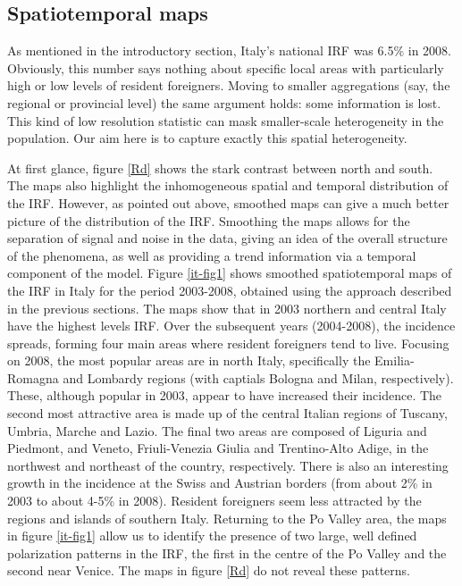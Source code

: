 \subsection{Spatiotemporal maps \label{STT}}

As mentioned in the introductory section, Italy's national IRF was 6.5\% in 2008. Obviously, this number says nothing about specific local areas with particularly high or low levels of resident foreigners. Moving to smaller aggregations (say, the regional or provincial level) the same argument holds: some information is lost. This kind of low resolution statistic can mask smaller-scale heterogeneity in the population. Our aim here is to capture exactly this spatial heterogeneity.

At first glance, figure \ref{Rd} shows the stark contrast between north and south. The maps also highlight the inhomogeneous spatial and temporal distribution of the IRF. However, as pointed out above, smoothed maps can \label{cor-2s1}give a much better picture of the distribution of the IRF. Smoothing the maps allows for the separation of signal and noise in the data, giving an idea of the overall structure of the phenomena, as well as providing a trend information via a temporal component of the model. Figure \ref{it-fig1} shows smoothed spatiotemporal maps of the IRF in Italy for the period 2003-2008, obtained using the approach described in the previous sections. The maps show that in 2003 northern and central Italy have the highest levels IRF. Over the subsequent years (2004-2008), the incidence spreads, forming four main areas where resident foreigners tend to live. Focusing on 2008, the most popular areas are in north Italy, specifically the Emilia-Romagna and Lombardy regions (with captials Bologna and Milan, respectively). These, although popular in 2003, appear to have increased their incidence. The second most attractive area is made up of the central Italian regions of Tuscany, Umbria, Marche and Lazio. The final two areas are composed of Liguria and Piedmont, and Veneto, Friuli-Venezia Giulia and Trentino-Alto Adige, in the northwest and northeast of the country, respectively. There is also an interesting growth in the incidence at the Swiss and Austrian borders (from about 2\% in 2003 to about 4-5\% in 2008). Resident foreigners seem less attracted by the regions and islands of southern Italy. Returning to the Po Valley area, the maps in figure \ref{it-fig1} allow us to identify the presence of two large, well defined polarization patterns in the IRF, the first in the centre of the Po Valley and the second near Venice. The maps in figure \ref{Rd} do not reveal these patterns.

